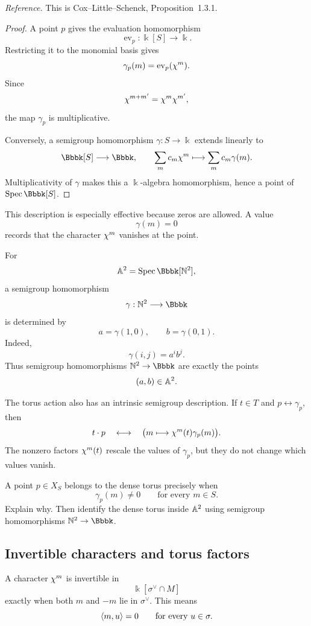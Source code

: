 \noindent
\textit{Reference.}
This is Cox--Little--Schenck, Proposition~1.3.1.

\begin{proof}
A point \(p\) gives the evaluation homomorphism
\[
\operatorname{ev}_p:\Bbbk[S]\longrightarrow\Bbbk.
\]
Restricting it to the monomial basis gives
\[
\gamma_p(m)=\operatorname{ev}_p(\chi^{m}).
\]
Since
\[
\chi^{m+m'}
=
\chi^{m}\chi^{m'},
\]
the map \(\gamma_p\) is multiplicative.

Conversely, a semigroup homomorphism \(\gamma:S\to\Bbbk\) extends
linearly to
\[
\Bbbk[S]\longrightarrow\Bbbk,
\qquad
\sum_m c_m\character{m}
\longmapsto
\sum_m c_m\gamma(m).
\]
Multiplicativity of \(\gamma\) makes this a \(\Bbbk\)-algebra
homomorphism, hence a point of \(\Spec\Bbbk[S]\).
\end{proof}

This description is especially effective because zeros are allowed.
A value
\[
\gamma(m)=0
\]
records that the character \(\chi^{m}\) vanishes at the point.

\begin{example}
For
\[
\AAA^2
=
\Spec\Bbbk[\NN^2],
\]
a semigroup homomorphism
\[
\gamma:\NN^2\longrightarrow\Bbbk
\]
is determined by
\[
a=\gamma(1,0),
\qquad
b=\gamma(0,1).
\]
Indeed,
\[
\gamma(i,j)=a^ib^j.
\]
Thus semigroup homomorphisms \(\NN^2\to\Bbbk\) are exactly the points
\[
(a,b)\in\mathbb{A}^2.
\]
\end{example}

The torus action also has an intrinsic semigroup description. If
\(t\in T\) and \(p\leftrightarrow\gamma_p\), then
\[
t\cdot p
\quad\longleftrightarrow\quad
\bigl(m\longmapsto\chi^{m}(t)\gamma_p(m)\bigr).
\]
The nonzero factors \(\chi^{m}(t)\) rescale the values of
\(\gamma_p\), but they do not change which values vanish.

\begin{pauseandthink}
A point \(p\in X_S\) belongs to the dense torus precisely when
\[
\gamma_p(m)\neq0
\qquad
\text{for every }m\in S.
\]
Explain why. Then identify the dense torus inside \(\mathbb{A}^2\) using
semigroup homomorphisms \(\NN^2\to\Bbbk\).
\end{pauseandthink}

\subsection{Invertible characters and torus factors}

A character \(\chi^{m}\) is invertible in
\[
\Bbbk[\sigma^\vee\cap M]
\]
exactly when both \(m\) and \(-m\) lie in \(\sigma^\vee\). This means
\[
\left\langle m,u\right\rangle=0
\qquad
\text{for every }u\in\sigma.
\]

